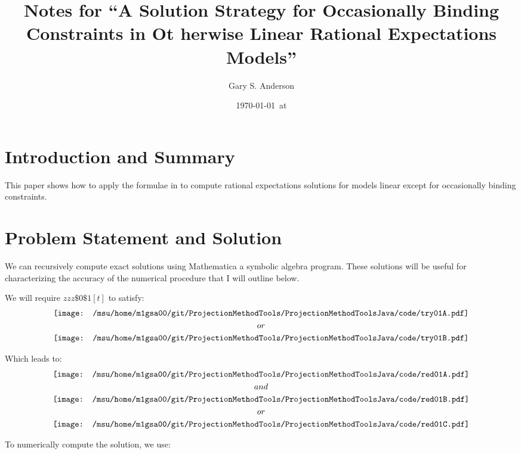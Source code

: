 \documentclass[12pt]{article}
\title{Notes for ``A Solution Strategy for Occasionally Binding Constraints in Ot
herwise
Linear Rational Expectations Models''}
\author{Gary S. Anderson}
\date{\today \   at \currenttime}
\begin{document}
\maketitle


\section{Introduction and Summary}
\label{sec:introduction-summary}

This paper shows how to apply the formulae in\citep{anderson10} to compute 
rational expectations solutions for models linear except for occasionally binding constraints.

\section{Problem Statement and Solution}
\label{sec:probl-stat-solut}




We can recursively compute exact solutions using
Mathematica a symbolic algebra program.  These solutions will be useful for
characterizing the accuracy of the numerical procedure that I will outline
below.

We will require $zzz\$0\$1[t]$ to satisfy:
 \begin{gather*}
\vcenter{\hbox{\texttt{[image: /msu/home/m1gsa00/git/ProjectionMethodTools/ProjectionMethodToolsJava/code/try01A.pdf]}}}\\
or\\
\vcenter{\hbox{\texttt{[image: /msu/home/m1gsa00/git/ProjectionMethodTools/ProjectionMethodToolsJava/code/try01B.pdf]}}}\\
 \end{gather*}


Which leads to:
 \begin{gather*}
\vcenter{\hbox{\texttt{[image: /msu/home/m1gsa00/git/ProjectionMethodTools/ProjectionMethodToolsJava/code/red01A.pdf]}}}\\
and\\
\vcenter{\hbox{\texttt{[image: /msu/home/m1gsa00/git/ProjectionMethodTools/ProjectionMethodToolsJava/code/red01B.pdf]}}}\\
or\\
\vcenter{\hbox{\texttt{[image: /msu/home/m1gsa00/git/ProjectionMethodTools/ProjectionMethodToolsJava/code/red01C.pdf]}}}
 \end{gather*}



To numerically compute the solution, we use:
\end{document}
